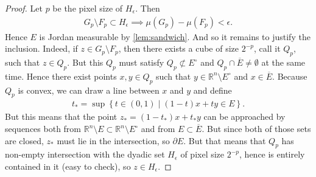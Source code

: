 \begin{proof}
    Let $p$ be the pixel size of $H_{\epsilon}$. Then
    \begin{align*}
        G_{p} \setminus F_{p} \subset H_{\epsilon} \implies \mu(G_{p}) - \mu(F_{p}) < \epsilon.
    \end{align*}
    Hence $E$ is Jordan measurable by \ref{lem:sandwich}. And so it remains to justify the inclusion. Indeed, if $z \in G_{p} \setminus F_{p}$, then there exists a cube of size $2^{-p}$, call it $Q_{p}$, such that $z \in Q_{p}$. But this $Q_{p}$ must satisfy $Q_{p} \not \subset E^{\circ }$ and $Q_{p} \cap \overline{ E } \neq \emptyset$ at the same time. Hence there exist points $x,y \in Q_{p}$ such that $y \in \mathbb{R}^{n} \setminus E^{\circ }$ and $x \in \overline{ E } $. Because $Q_{p}$ is convex, we can draw a line between $x$ and $y$ and define
    \begin{align*}
        t_{*} = \sup \left\{ t \in (0,1) \mid (1-t)x+ty \in E  \right\}.
    \end{align*}
    But this means that the point $z_{*} = (1-t_{*})x + t_{*}y$ can be approached by sequences both from $\mathbb{R}^{n} \setminus E \subset \mathbb{R}^{n} \setminus E^{\circ }$ and from $E \subset \overline{ E } $. But since both of those sets are closed, $z_{*}$ must lie in the intersection, so $\partial E$. But that means that $Q_{p}$ has non-empty intersection with the dyadic set $H_{\epsilon}$ of pixel size $2^{-p}$, hence is entirely contained in it (easy to check), so $z \in H_{\epsilon}$.
\end{proof}

